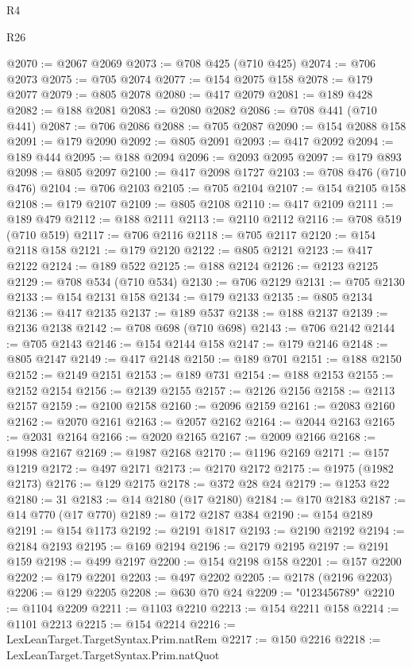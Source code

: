 \begin{lexlean}{R4}
\begin{lexlean}{R26}
\begin{coremodule}
{{{{{{{{{{{{{{{{{{{{{{{{{{{{{{{{{{{{{{{{{{{{{{{{{{{{{{{{{{{{{{{{{{{{{{{{@2070 := @2067 @2069
@2073 := @708 @425 (@710 @425)
@2074 := @706 @2073
@2075 := @705 @2074
@2077 := @154 @2075 @158
@2078 := @179 @2077
@2079 := @805 @2078
@2080 := @417 @2079
@2081 := @189 @428
@2082 := @188 @2081
@2083 := @2080 @2082
@2086 := @708 @441 (@710 @441)
@2087 := @706 @2086
@2088 := @705 @2087
@2090 := @154 @2088 @158
@2091 := @179 @2090
@2092 := @805 @2091
@2093 := @417 @2092
@2094 := @189 @444
@2095 := @188 @2094
@2096 := @2093 @2095
@2097 := @179 @893
@2098 := @805 @2097
@2100 := @417 @2098 @1727
@2103 := @708 @476 (@710 @476)
@2104 := @706 @2103
@2105 := @705 @2104
@2107 := @154 @2105 @158
@2108 := @179 @2107
@2109 := @805 @2108
@2110 := @417 @2109
@2111 := @189 @479
@2112 := @188 @2111
@2113 := @2110 @2112
@2116 := @708 @519 (@710 @519)
@2117 := @706 @2116
@2118 := @705 @2117
@2120 := @154 @2118 @158
@2121 := @179 @2120
@2122 := @805 @2121
@2123 := @417 @2122
@2124 := @189 @522
@2125 := @188 @2124
@2126 := @2123 @2125
@2129 := @708 @534 (@710 @534)
@2130 := @706 @2129
@2131 := @705 @2130
@2133 := @154 @2131 @158
@2134 := @179 @2133
@2135 := @805 @2134
@2136 := @417 @2135
@2137 := @189 @537
@2138 := @188 @2137
@2139 := @2136 @2138
@2142 := @708 @698 (@710 @698)
@2143 := @706 @2142
@2144 := @705 @2143
@2146 := @154 @2144 @158
@2147 := @179 @2146
@2148 := @805 @2147
@2149 := @417 @2148
@2150 := @189 @701
@2151 := @188 @2150
@2152 := @2149 @2151
@2153 := @189 @731
@2154 := @188 @2153
@2155 := @2152 @2154
@2156 := @2139 @2155
@2157 := @2126 @2156
@2158 := @2113 @2157
@2159 := @2100 @2158
@2160 := @2096 @2159
@2161 := @2083 @2160
@2162 := @2070 @2161
@2163 := @2057 @2162
@2164 := @2044 @2163
@2165 := @2031 @2164
@2166 := @2020 @2165
@2167 := @2009 @2166
@2168 := @1998 @2167
@2169 := @1987 @2168
@2170 := @1196 @2169
@2171 := @157 @1219
@2172 := @497 @2171
@2173 := @2170 @2172
@2175 := @1975 (@1982 @2173)
@2176 := @129 @2175
@2178 := @372 @28 @24
@2179 := @1253 @22
@2180 := 31
@2183 := @14 @2180 (@17 @2180)
@2184 := @170 @2183
@2187 := @14 @770 (@17 @770)
@2189 := @172 @2187 @384
@2190 := @154 @2189
@2191 := @154 @1173
@2192 := @2191 @1817
@2193 := @2190 @2192
@2194 := @2184 @2193
@2195 := @169 @2194
@2196 := @2179 @2195
@2197 := @2191 @159
@2198 := @499 @2197
@2200 := @154 @2198 @158
@2201 := @157 @2200
@2202 := @179 @2201
@2203 := @497 @2202
@2205 := @2178 (@2196 @2203)
@2206 := @129 @2205
@2208 := @630 @70 @24
@2209 := "0123456789"
@2210 := @1104 @2209
@2211 := @1103 @2210
@2213 := @154 @2211 @158
@2214 := @1101 @2213
@2215 := @154 @2214
@2216 := LexLeanTarget.TargetSyntax.Prim.natRem
@2217 := @150 @2216
@2218 := LexLeanTarget.TargetSyntax.Prim.natQuot
}}}}}}}}}}}}}}}}}}}}}}}}}}}}}}}}}}}}}}}}}}}}}}}}}}}}}}}}}}}}}}}}}}}}}}}}
\end{coremodule}
\end{lexlean}
\end{lexlean}
